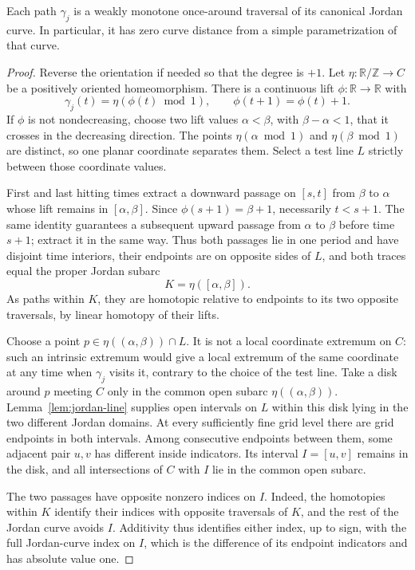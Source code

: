 \begin{lemma}\label{lem:no-backtracking}
Each path $\gamma_j$ is a weakly monotone once-around traversal of its canonical Jordan curve. In particular, it has zero curve distance from a simple parametrization of that curve.
\end{lemma}

\begin{proof}
Reverse the orientation if needed so that the degree is $+1$. Let $\eta:\mathbb R/\mathbb Z\to C$ be a positively oriented homeomorphism. There is a continuous lift $\phi:\mathbb R\to\mathbb R$ with
\[
 \gamma_j(t)=\eta(\phi(t)\bmod1),\qquad
 \phi(t+1)=\phi(t)+1.
\]
If $\phi$ is not nondecreasing, choose two lift values $\alpha<\beta$, with $\beta-\alpha<1$, that it crosses in the decreasing direction. The points $\eta(\alpha\bmod1)$ and $\eta(\beta\bmod1)$ are distinct, so one planar coordinate separates them. Select a test line $L$ strictly between those coordinate values.

First and last hitting times extract a downward passage on $[s,t]$ from $\beta$ to $\alpha$ whose lift remains in $[\alpha,\beta]$. Since $\phi(s+1)=\beta+1$, necessarily $t<s+1$. The same identity guarantees a subsequent upward passage from $\alpha$ to $\beta$ before time $s+1$; extract it in the same way. Thus both passages lie in one period and have disjoint time interiors, their endpoints are on opposite sides of $L$, and both traces equal the proper Jordan subarc
\[
 K=\eta([\alpha,\beta]).
\]
As paths within $K$, they are homotopic relative to endpoints to its two opposite traversals, by linear homotopy of their lifts.

Choose a point $p\in\eta((\alpha,\beta))\cap L$. It is not a local coordinate extremum on $C$: such an intrinsic extremum would give a local extremum of the same coordinate at any time when $\gamma_j$ visits it, contrary to the choice of the test line. Take a disk around $p$ meeting $C$ only in the common open subarc $\eta((\alpha,\beta))$. Lemma~\ref{lem:jordan-line} supplies open intervals on $L$ within this disk lying in the two different Jordan domains. At every sufficiently fine grid level there are grid endpoints in both intervals. Among consecutive endpoints between them, some adjacent pair $u,v$ has different inside indicators. Its interval $I=[u,v]$ remains in the disk, and all intersections of $C$ with $I$ lie in the common open subarc.

The two passages have opposite nonzero indices on $I$. Indeed, the homotopies within $K$ identify their indices with opposite traversals of $K$, and the rest of the Jordan curve avoids $I$. Additivity thus identifies either index, up to sign, with the full Jordan-curve index on $I$, which is the difference of its endpoint indicators and has absolute value one.


\end{proof}
